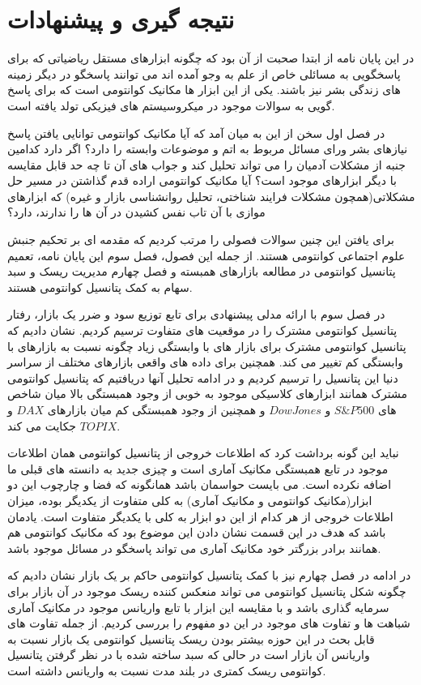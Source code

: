 \documentclass[a4paper,titlepage,12pt,fleqn,oneside]{report}
\begin{document}
\chapter{نتیجه گیری و پیشنهادات}
در این پایان نامه از ابتدا صحبت از آن بود که چگونه ابزارهای مستقل ریاضیاتی که برای پاسخگویی به مسائلی خاص از علم به وجو آمده اند می توانند پاسخگو در دیگر زمینه های زندگی بشر نیز باشند. یکی از این ابزار ها مکانیک کوانتومی است که برای پاسخ گویی به سوالات موجود در میکروسیستم های فیزیکی تولد یافته است. 

در فصل اول سخن از این به میان آمد که آیا مکانیک کوانتومی توانایی یافتن پاسخ نیازهای بشر ورای مسائل مربوط به اتم و موضوعات وابسته را دارد؟ اگر دارد کدامین جنبه از مشکلات آدمیان را می تواند تحلیل کند و جواب های آن تا چه حد قابل مقایسه با دیگر ابزارهای موجود است؟ آیا مکانیک کوانتومی اراده قدم گذاشتن در مسیر حل مشکلاتی(همچون مشکلات فرایند شناختی، تحلیل روانشناسی بازار و غیره) که ابزارهای موازی با آن تاب نفس کشیدن در آن ها را ندارند، دارد؟ 

برای یافتن این چنین سوالات فصولی را مرتب کردیم که مقدمه ای بر تحکیم جنبش علوم اجتماعی کوانتومی هستند. از جمله این فصول، فصل سوم این پایان نامه، تعمیم پتانسیل کوانتومی در مطالعه بازارهای همبسته و فصل چهارم مدیریت ریسک و سبد سهام به کمک پتانسیل کوانتومی هستند.

در فصل سوم با ارائه مدلی پیشنهادی برای تابع توزیع سود و ضرر یک بازار، رفتار پتانسیل کوانتومی مشترک را در موقعیت های متفاوت ترسیم کردیم. نشان دادیم که پتانسیل کوانتومی مشترک برای بازار های با وابستگی زیاد چگونه نسبت به بازارهای با وابستگی کم تغییر می کند. همچنین برای داده های واقعی بازارهای مختلف از سراسر دنیا این پتانسیل را ترسیم کردیم و در ادامه تحلیل آنها دریافتیم که پتانسیل کوانتومی مشترک همانند ابزارهای کلاسیکی موجود به خوبی از وجود همبستگی بالا میان شاخص های 
$S\&P500$
و 
$Dow Jones$
و همچنین از وجود همبستگی کم میان بازارهای 
$DAX$
و 
$TOPIX$
جکایت می کند. 

نباید این گونه برداشت کرد که اطلاعات خروجی از پتانسیل کوانتومی همان اطلاعات موجود در تابع همبستگی مکانیک آماری است و چیزی جدید به دانسته های قبلی ما اضافه نکرده است. می بایست حواسمان باشد همانگونه که فضا و چارچوب این دو ابزار(مکانیک کوانتومی و مکانیک آماری) به کلی متفاوت از یکدیگر بوده، میزان اطلاعات خروجی از هر کدام از این دو ابزار به کلی با یکدیگر متفاوت است.  یادمان باشد که هدف در این قسمت نشان دادن این موضوع بود که مکانیک کوانتومی هم همانند برادر بزرگتر خود مکانیک آماری می تواند پاسخگو در مسائل موجود باشد. 

در ادامه در فصل چهارم نیز با کمک پتانسیل کوانتومی حاکم بر یک بازار نشان دادیم که چگونه شکل پتانسیل کوانتومی می تواند منعکس کننده ریسک موجود در آن بازار برای سرمایه گذاری باشد و با مقایسه این ابزار با تابع واریانس موجود در مکانیک آماری شباهت ها و تفاوت های موجود در این دو مفهوم را بررسی کردیم. از جمله تفاوت های قابل بحث در این حوزه بیشتر بودن ریسک پتانسیل کوانتومی یک بازار نسبت به واریانس آن بازار است در حالی که سبد ساخته شده با در نظر گرفتن پتانسیل کوانتومی ریسک کمتری در بلند مدت نسبت به واریانس داشته است. 
\end{document}
